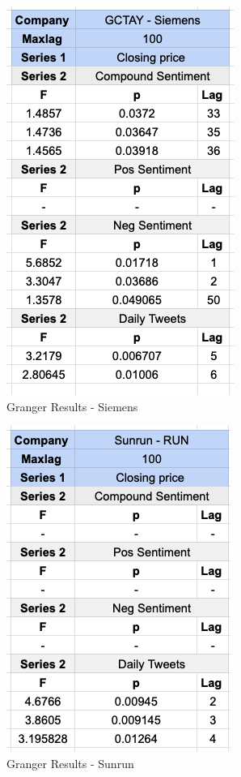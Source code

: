 \documentclass[sigconf, nonacm]{acmart}
\begin{document}
\begin{figure}[H]
  \centering
  \includegraphics[width=0.7\linewidth]{granger_results/granger_siemens.png}
  \caption{Granger Results - Siemens}
  \label{granger_siemens}
\end{figure}

\begin{figure}[H]
  \centering
  \includegraphics[width=0.7\linewidth]{granger_results/granger_sunrun.png}
  \caption{Granger Results - Sunrun}
  \label{granger_sunrun}
\end{figure}
\end{document}
